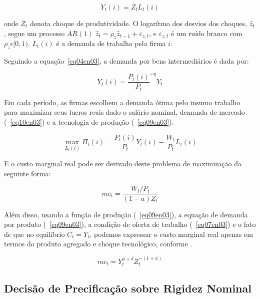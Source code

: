 \documentclass[twoside,a4paper,11pt]{report}
\begin{document}
\begin{equation}\label{eq09en03}
Y_{t}(i)=Z_{t}L_{t}(i)
\end{equation}

\noindent onde $Z_{t}$ denota choque de produtividade. O logarítmo dos desvios dos choques, ${\hat{z}}_{t}$, segue um processo $AR(1)$ ${\hat{z}}_{t}={\rho}_{z}{\hat{z}}_{t-1}+{\varepsilon}_{z,t}$, e ${\varepsilon}_{z,t}$ é um ruído branco com ${\rho}_{z}\epsilon [0,1)$. $L_{t}(i)$ é a demanda de trabalho pela firma $i$. 

Seguindo a equação~\ref{eq04en03}, a demanda por bens intermediários é dada por:

\begin{equation}\label{eq10en03}
{Y}_{t}(i)={\frac{{P}_{t}(i)}{{P}_{t}}}^{-\eta}{Y}_{t}
\end{equation}

Em cada período, as firmas escolhem a demanda ótima pelo insumo trabalho para maximizar seus lucros reais dado o salário nominal, demanda de mercado (~\ref{eq10en03}) e a tecnologia de produção (~\ref{eq09en03}):

\begin{equation}\label{eq11en03}
\max _{{L}_{t}(i)}{{{\Pi}_{t}(i)}}=\frac{{P}_{t}(i)}{{P}_{t}}{Y}_{t}(i)-\frac{{W}_{t}}{{P}_{t}}{L}_{t}(i)
\end{equation}

E o custo marginal real pode ser derivado deste problema de maximização da seguinte forma:

\begin{equation}\label{eq12en03}
{mc}_{t}=\frac{{{W}_{t}}/{{P}_{t}}}{(1-a){Z}_{t}} 
\end{equation}

Além disso, usando a função de produção (~\ref{eq09en03}), a equação de demanda por produto (~\ref{eq09en03}), a condição de oferta de trabalho (~\ref{eq07en03}) e o fato de que no equilíbrio $C_{t}=Y_{t}$, podemos expressar o custo marginal real apenas em termos do produto agregado e choque tecnológico, conforme \citet{yao2010aggregate}. 

\begin{equation}\label{eq13en03}
{mc}_{t}={Y}_{t}^{\phi +\delta}{Z}_{t}^{-(1+\phi)}
\end{equation}

\subsection*{Decisão de Precificação sobre Rigidez Nominal}
\end{document}
